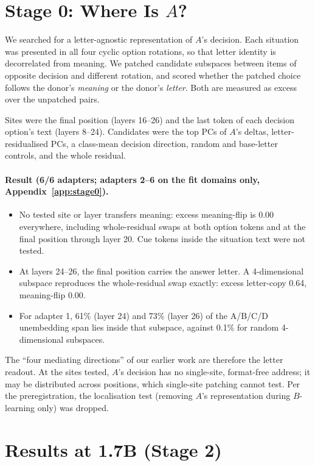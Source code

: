 \documentclass[11pt]{article}
\begin{document}
\section{Stage 0: Where Is $A$?}\label{sec:stage0}

We searched for a letter-agnostic representation of $A$'s decision. Each situation was presented in all four cyclic option rotations, so that letter identity is decorrelated from meaning. We patched candidate subspaces between items of opposite decision and different rotation, and scored whether the patched choice follows the donor's \emph{meaning} or the donor's \emph{letter}. Both are measured as excess over the unpatched pairs.

Sites were the final position (layers 16--26) and the last token of each decision option's text (layers 8--24). Candidates were the top PCs of $A$'s deltas, letter-residualised PCs, a class-mean decision direction, random and base-letter controls, and the whole residual.

\paragraph{Result (6/6 adapters; adapters 2--6 on the fit domains only, Appendix~\ref{app:stage0}).}
\begin{itemize}
\item No tested site or layer transfers meaning: excess meaning-flip is 0.00 everywhere, including whole-residual swaps at both option tokens and at the final position through layer 20. Cue tokens inside the situation text were not tested.
\item At layers 24--26, the final position carries the answer letter. A 4-dimensional subspace reproduces the whole-residual swap exactly: excess letter-copy 0.64, meaning-flip 0.00.
\item For adapter 1, 61\% (layer 24) and 73\% (layer 26) of the A/B/C/D unembedding span lies inside that subspace, against 0.1\% for random 4-dimensional subspaces.
\end{itemize}

The ``four mediating directions'' of our earlier work are therefore the letter readout. At the sites tested, $A$'s decision has no single-site, format-free address; it may be distributed across positions, which single-site patching cannot test. Per the preregistration, the localisation test (removing $A$'s representation during $B$-learning only) was dropped.

\section{Results at 1.7B (Stage 2)}\label{sec:stage2}
\end{document}
